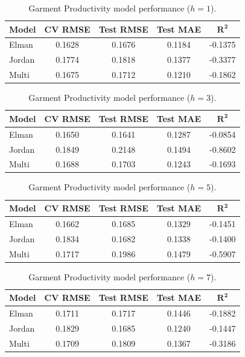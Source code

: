\documentclass[conference]{IEEEtran}
\begin{document}
\begin{table}[H]
\centering
\caption{Garment Productivity model performance ($h=1$).}
\label{tab:gp_h1}
\begin{tabular}{lcccc}
\toprule
\textbf{Model} & \textbf{CV RMSE} & \textbf{Test RMSE} & \textbf{Test MAE} & $\mathbf{R^2}$ \\
\midrule
Elman  & 0.1628 & 0.1676 & 0.1184 & -0.1375 \\
Jordan & 0.1774 & 0.1818 & 0.1377 & -0.3377 \\
Multi  & 0.1675 & 0.1712 & 0.1210 & -0.1862 \\
\bottomrule
\end{tabular}
\end{table}

\begin{table}[H]
\centering
\caption{Garment Productivity model performance ($h=3$).}
\label{tab:gp_h3}
\begin{tabular}{lcccc}
\toprule
\textbf{Model} & \textbf{CV RMSE} & \textbf{Test RMSE} & \textbf{Test MAE} & $\mathbf{R^2}$ \\
\midrule
Elman  & 0.1650 & 0.1641 & 0.1287 & -0.0854 \\
Jordan & 0.1849 & 0.2148 & 0.1494 & -0.8602 \\
Multi  & 0.1688 & 0.1703 & 0.1243 & -0.1693 \\
\bottomrule
\end{tabular}
\end{table}

\begin{table}[H]
\centering
\caption{Garment Productivity model performance ($h=5$).}
\label{tab:gp_h5}
\begin{tabular}{lcccc}
\toprule
\textbf{Model} & \textbf{CV RMSE} & \textbf{Test RMSE} & \textbf{Test MAE} & $\mathbf{R^2}$ \\
\midrule
Elman  & 0.1662 & 0.1685 & 0.1329 & -0.1451 \\
Jordan & 0.1834 & 0.1682 & 0.1338 & -0.1400 \\
Multi  & 0.1717 & 0.1986 & 0.1479 & -0.5907 \\
\bottomrule
\end{tabular}
\end{table}

\begin{table}[H]
\centering
\caption{Garment Productivity model performance ($h=7$).}
\label{tab:gp_h7}
\begin{tabular}{lcccc}
\toprule
\textbf{Model} & \textbf{CV RMSE} & \textbf{Test RMSE} & \textbf{Test MAE} & $\mathbf{R^2}$ \\
\midrule
Elman  & 0.1711 & 0.1717 & 0.1446 & -0.1882 \\
Jordan & 0.1829 & 0.1685 & 0.1240 & -0.1447 \\
Multi  & 0.1709 & 0.1809 & 0.1367 & -0.3186 \\
\bottomrule
\end{tabular}
\end{table}
\end{document}
